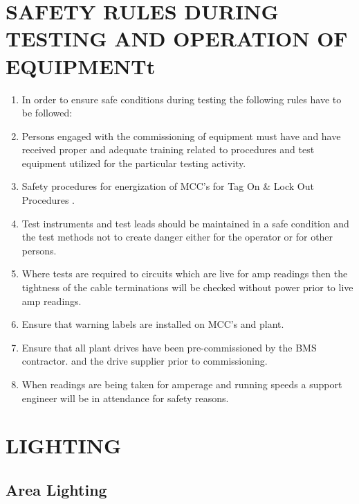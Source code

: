 \section{SAFETY RULES DURING TESTING AND OPERATION OF EQUIPMENTt}
\begin{enumerate}
\item	In order to ensure safe conditions during testing the following rules have to be followed:
\item	Persons engaged with the commissioning of equipment must have  and have received proper and adequate training related to procedures and test equipment utilized for the particular testing activity.  
\item	Safety procedures for energization of MCC’s for Tag On \& Lock Out Procedures .
\item	Test instruments and test leads should be maintained in a safe condition and the test methods not to create danger either for the operator or for other persons.
\item	Where tests are required to circuits which are live for amp readings then the tightness of the cable terminations will be checked without power prior to live amp readings.
        \item     Ensure that warning labels are installed on MCC’s and plant.
	\item     Ensure that all plant drives have been pre-commissioned by the BMS contractor. 
 and the drive supplier prior to commissioning.
\item	When readings are being taken for amperage and running speeds a support engineer    will be in attendance for safety reasons.
\end{enumerate}


\section{LIGHTING}
\subsection{Area Lighting}

